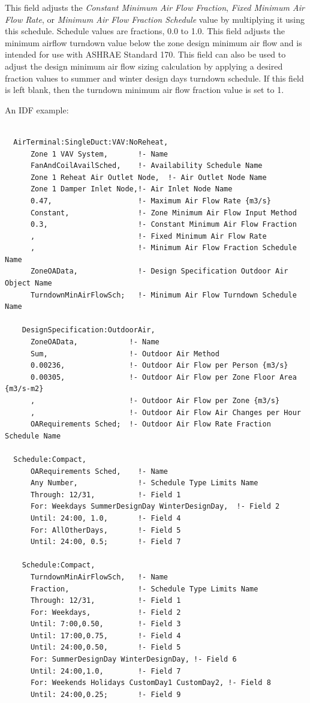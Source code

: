 This field adjusts the \textit{Constant Minimum Air Flow Fraction}, \textit{Fixed Minimum Air Flow Rate}, or \textit{Minimum Air Flow Fraction Schedule} value by multiplying it using this schedule. Schedule values are fractions, 0.0 to 1.0. This field adjusts the minimum airflow turndown value below the zone design minimum air flow and is intended for use with ASHRAE Standard 170. This field can also be used to adjust the design minimum air flow sizing calculation by applying a desired fraction values to summer and winter design days turndown schedule. If this field is left blank, then the turndown minimum air flow fraction value is set to 1.

An IDF example:

\begin{lstlisting}

  AirTerminal:SingleDuct:VAV:NoReheat,
      Zone 1 VAV System,       !- Name
      FanAndCoilAvailSched,    !- Availability Schedule Name
      Zone 1 Reheat Air Outlet Node,  !- Air Outlet Node Name
      Zone 1 Damper Inlet Node,!- Air Inlet Node Name
      0.47,                    !- Maximum Air Flow Rate {m3/s}
      Constant,                !- Zone Minimum Air Flow Input Method
      0.3,                     !- Constant Minimum Air Flow Fraction
      ,                        !- Fixed Minimum Air Flow Rate
      ,                        !- Minimum Air Flow Fraction Schedule Name
      ZoneOAData,              !- Design Specification Outdoor Air Object Name
      TurndownMinAirFlowSch;   !- Minimum Air Flow Turndown Schedule Name

    DesignSpecification:OutdoorAir,
      ZoneOAData,            !- Name
      Sum,                   !- Outdoor Air Method
      0.00236,               !- Outdoor Air Flow per Person {m3/s}
      0.00305,               !- Outdoor Air Flow per Zone Floor Area {m3/s-m2}
      ,                      !- Outdoor Air Flow per Zone {m3/s}
      ,                      !- Outdoor Air Flow Air Changes per Hour
      OARequirements Sched;  !- Outdoor Air Flow Rate Fraction Schedule Name

  Schedule:Compact,
      OARequirements Sched,    !- Name
      Any Number,              !- Schedule Type Limits Name
      Through: 12/31,          !- Field 1
      For: Weekdays SummerDesignDay WinterDesignDay,  !- Field 2
      Until: 24:00, 1.0,       !- Field 4
      For: AllOtherDays,       !- Field 5
      Until: 24:00, 0.5;       !- Field 7

    Schedule:Compact,
      TurndownMinAirFlowSch,   !- Name
      Fraction,                !- Schedule Type Limits Name
      Through: 12/31,          !- Field 1
      For: Weekdays,           !- Field 2
      Until: 7:00,0.50,        !- Field 3
      Until: 17:00,0.75,       !- Field 4
      Until: 24:00,0.50,       !- Field 5
      For: SummerDesignDay WinterDesignDay, !- Field 6
      Until: 24:00,1.0,        !- Field 7
      For: Weekends Holidays CustomDay1 CustomDay2, !- Field 8
      Until: 24:00,0.25;       !- Field 9
\end{lstlisting}


